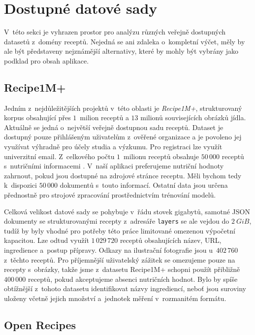 \section{Dostupné datové sady}

V~této sekci je vyhrazen prostor pro analýzu různých veřejně dostupných datasetů z~domény receptů. Nejedná se ani zdaleka o~kompletní výčet, měly by ale být představeny nejznámější alternativy, které by mohly být vybrány jako podklad pro obsah aplikace. 

\subsection{Recipe1M+}

Jedním z~nejdůležitějších projektů v~této oblasti je \emph{Recipe1M+}, strukturovaný korpus obsahující přes $1$~milion receptů a $13$ milionů souvisejících obrázků jídla. Aktuálně se jedná o~největší veřejně dostupnou sadu receptů. Dataset je dostupný pouze přihlášeným uživatelům z~ověřené organizace a je povoleno jej využívat výhradně pro účely studia a výzkumu. Pro registraci lze využít univerzitní email. Z~celkového počtu $1$~milionu receptů obsahuje $50\,000$ receptů s~nutričními informacemi \citep{marin2019learning}. V~naší aplikaci preferujeme nutriční hodnoty zahrnout, pokud jsou dostupné na zdrojové stránce receptu. Měli bychom tedy k~dispozici $50\,000$ dokumentů s~touto informací. Ostatní data jsou určena přednostně pro strojové zpracování prostřednictvím trénování modelů.

Celková velikost datové sady se pohybuje v~řádu stovek gigabytů, samotné JSON dokumenty se strukturovanými recepty z~adresáře \texttt{layers} se ale vejdou do $2~GiB$, tudíž by byly vhodné pro potřeby této práce limitované omezenou výpočetní kapacitou. Lze odtud využít $1\,029\,720$ receptů obsahujících název, URL, ingredience a~postup přípravy. Odkazy na ilustrační fotografie jsou u~$402\,760$ z~těchto receptů. Pro příjemnější uživatelský zážitek se omezujeme pouze na recepty s~obrázky, takže jsme z~datasetu Recipe1M+ schopni použít přibližně $400\,000$ receptů, pokud akceptujeme absenci nutričních hodnot. Bylo by spíše obtížnější z~tohoto datasetu identifikovat názvy ingrediencí, neboť jsou suroviny uloženy včetně jejich množství a~jednotek měření v~rozmanitém formátu.

\subsection{Open Recipes}

